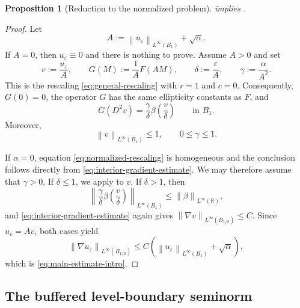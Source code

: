 \documentclass[11pt,letterpaper]{amsart}
\numberwithin{equation}{section}
\newcommand{\eps}{\varepsilon}
\newcommand{\norm}[1]{\left\lVert #1\right\rVert}
\newtheorem{proposition}[theorem]{Proposition}
\theoremstyle{definition}
\theoremstyle{remark}
\begin{document}
\begin{proposition}[Reduction to the normalized problem]
\label{prop:normalization}
 implies .
\end{proposition}
\begin{proof}
Let
$$
A
:=
\norm{u_\eps}_{L^\infty(B_1)}+\sqrt\alpha.
$$
If $A=0$, then $u_\eps\equiv0$ and there is nothing to prove. Assume
$A>0$ and set
$$
v:=\frac{u_\eps}{A},
\qquad
G(M):=\frac1A F(AM),
\qquad
\delta:=\frac\eps A,
\qquad
\gamma:=\frac\alpha{A^2}.
$$
This is the rescaling \eqref{eq:general-rescaling} with $r=1$ and $c=0$.
Consequently, $G(0)=0$, the operator $G$ has the same ellipticity constants as
$F$, and
\begin{equation}\label{eq:normalized-rescaling}
G(D^2v)
=
\frac{\gamma}{\delta}
\beta\left(\frac{v}{\delta}\right)
\qquad\text{in }B_1.
\end{equation}
Moreover,
$$
\norm{v}_{L^\infty(B_1)}\leq1,
\qquad
0\leq\gamma\leq1.
$$

If $\alpha=0$, equation \eqref{eq:normalized-rescaling} is homogeneous and
the conclusion follows directly from \eqref{eq:interior-gradient-estimate}.
We may therefore assume that $\gamma>0$. If $\delta\leq1$, we apply
 to $v$. If $\delta>1$, then
$$
\left\|
\frac{\gamma}{\delta}
\beta\left(\frac{v}{\delta}\right)
\right\|_{L^\infty(B_1)}
\leq
\norm{\beta}_{L^\infty(\mathbb R)},
$$
and \eqref{eq:interior-gradient-estimate} again gives
$\norm{\nabla v}_{L^\infty(B_{1/2})}\leq C$. Since $u_\eps=Av$, both cases
yield
$$
\norm{\nabla u_\eps}_{L^\infty(B_{1/2})}
\leq
C\left(
\norm{u_\eps}_{L^\infty(B_1)}+\sqrt\alpha
\right),
$$
which is \eqref{eq:main-estimate-intro}.
\end{proof}

\subsection{The buffered level-boundary seminorm}\label{subsec:buffered-level-boundary}
\end{document}
